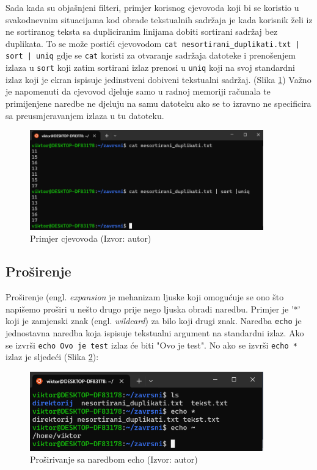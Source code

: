 \documentclass{foi}
\begin{document}
\begin{flushleft}
    Sada kada su objašnjeni filteri, primjer korisnog cjevovoda koji bi se koristio u svakodnevnim situacijama kod obrade tekstualnih sadržaja je kada korisnik želi iz ne sortiranog teksta sa dupliciranim linijama dobiti sortirani sadržaj bez duplikata. To se može postići cjevovodom \verb+cat nesortirani_duplikati.txt | sort | uniq+ gdje se \verb|cat| koristi za otvaranje sadržaja datoteke i prenošenjem izlaza u \verb|sort| koji zatim sortirani izlaz prenosi u \verb|uniq| koji na svoj standardni izlaz koji je ekran ispisuje jedinstveni dobiveni tekstualni sadržaj. (Slika \ref{fig:cjevovod}) Važno je napomenuti da cjevovod djeluje samo u radnoj memoriji računala te primijenjene naredbe ne djeluju na samu datoteku ako se to izravno ne specificira sa preusmjeravanjem izlaza u tu datoteku\cite{UbuntuPipeline}.
\end{flushleft}
\begin{figure}[H]
    \centering
    \includegraphics[width=0.9\textwidth]{slike/cjevovod.png}
    \caption{Primjer cjevovoda (Izvor: autor)}
    \label{fig:cjevovod}
\end{figure}

\subsection{Proširenje}
Proširenje (engl. \textit{expansion} je mehanizam ljuske koji omogućuje se ono što napišemo proširi u nešto drugo prije nego ljuska obradi naredbu\cite{LinuxCommandExpansion}. Primjer je '*' koji je zamjenski znak (engl. \textit{wildcard}) za bilo koji drugi znak\cite{LinuxCommandPermissions}.
Naredba \verb|echo| je jednostavna naredba koja ispisuje tekstualni argument na standardni izlaz. Ako se izvrši \verb|echo Ovo je test| izlaz će biti "Ovo je test". No ako se izvrši \verb|echo *| izlaz je sljedeći (Slika \ref{fig:echo}):

\begin{figure}[H]
    \centering
    \includegraphics[width=0.9\textwidth]{slike/echo.png}
    \caption{Proširivanje sa naredbom echo (Izvor: autor)}
    \label{fig:echo}
\end{figure}
\end{document}
